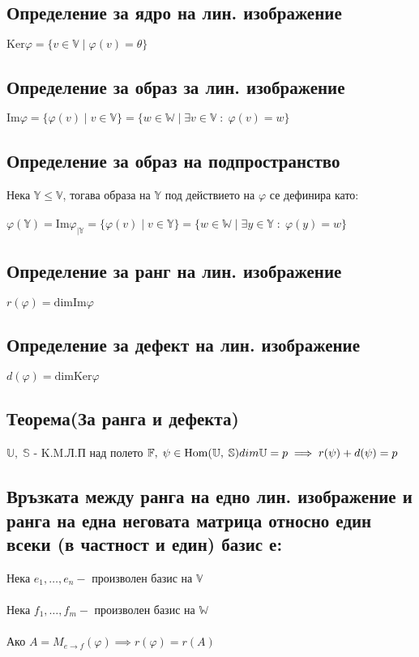 \documentclass{article}
\newcommand{\V}{\mathbb{V}}
\newcommand{\F}{\mathbb{F}}
\newcommand{\W}{\mathbb{W}}
\newcommand{\UV}{\mathbb{U}}
\newcommand{\n}[1]{#1_1, \dots, #1_n}
\newcommand{\m}[1]{#1_1, \dots, #1_m}
\newcommand{\OV}{\theta}
\begin{document}
    \subsection{Определение за ядро на лин. изображение}
    \(\mathrm{Ker} \varphi = \{v \in \V \; | \; \varphi(v) =\OV\}\)
    \subsection{Определение за образ за лин. изображение}
    \(\mathrm{Im} \varphi = \{\varphi(v) \; | \; v \in \V\} = \{w \in \W \; | \; \exists v \in \V \; : \; \varphi(v) = w \}\)
    \subsection{Определение за образ на подпространство}
    Нека \(\mathbb{Y} \leq \V\), тогава образа на \(\mathbb{Y}\) под действието на \(\varphi\) се дефинира като: \\\\
    \(\varphi(\mathbb{Y}) = \mathrm{Im}\varphi_{|\mathbb{Y}}
    = \{\varphi(v) \; | \; v \in \mathbb{Y}\} = \{w \in \W \; | \; \exists y \in \mathbb{Y} \; : \; \varphi(y) = w \}\)
    \subsection{Определение за ранг на лин. изображение}
    \(r(\varphi) = \mathrm{dim}\mathrm{Im}\varphi\)
    \subsection{Определение за дефект на лин. изображение}
    \(d(\varphi) = \mathrm{dim}\mathrm{Ker}\varphi\)
    \subsection{Теорема(За ранга и дефекта)}
    \(\UV, \; \mathbb{S}\) - K.M.Л.П над полето \(\F, \; \psi \in \mathrm{Hom}(\UV, \; \mathbb{S}) \\\\
    dim\UV = p \implies r(\psi) + d(\psi) = p\)
    \subsection{Връзката между ранга на едно лин. изображение и ранга на една неговата матрица относно един всеки (в частност и един) базис е:}
    Нека \(\n{e} - \text{ произволен базис на } \V\) \\\\
    Нека \(\m{f} - \text{ произволен базис на } \W\) \\\\
    Ако \(A = M_{e \to f}(\varphi) \implies r(\varphi) = r(A)\)
\end{document}
